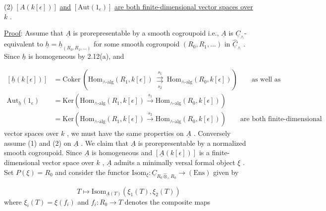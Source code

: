 (2)  $[A(k[\epsilon])]$  \underline{and}  $[\mathrm{Aut}(1_{\epsilon})]$  \underline{are both finite-dimensional vector spaces over}  $k$  .

\underline{Proof}:  Assume that  $\underline{A}$  is prorepresentable by a smooth cogroupoid i.e.,  $\underline{A}$  is  $\underline{C}_{\wedge}$-equivalent to  $\underline{h} = \underline{h}_{(R_{0},R_{1},\ldots)}$  for some smooth cogroupoid  $(R_{0},R_{1},\ldots)$  in  $\hat{\underline{C}}_{\wedge}$  . Since  $\underline{h}$  is homogeneous by 2.12(a), and

\begin{equation*}
\begin{aligned}
[\underline{h}(k[\epsilon])] &= \mathrm{Coker}\ (\mathrm{Hom}_{\wedge\text{-alg}}(R_{1},k[\epsilon]) \ \underset{s_{2}}{\overset{s_{1}}{\rightrightarrows}}\ \mathrm{Hom}_{\wedge\text{-alg}}(R_{0},k[\epsilon])) \qquad \text{as well as} \\[2ex]
\mathrm{Aut}_{\underline{h}}(1_{\epsilon}) &= \mathrm{Ker}(\mathrm{Hom}_{\wedge\text{-alg}}(R_{1},k[\epsilon]) \xrightarrow{\ s_{1}\ } \mathrm{Hom}_{\wedge\text{-alg}}(R_{0},k[\epsilon])) \\[2ex]
&= \mathrm{Ker}(\mathrm{Hom}_{\wedge\text{-alg}}(R_{1},k[\epsilon]) \xrightarrow{\ s_{2}\ } \mathrm{Hom}_{\wedge\text{-alg}}(R_{0},k[\epsilon])) \qquad \text{are both finite-dimensional}
\end{aligned}
\end{equation*}
vector spaces over  $k$  , we must have the same properties on  $\underline{A}$  . Conversely assume (1) and (2) on  $\underline{A}$  . We claim that  $\underline{A}$  is prorepresentable by a normalized smooth cogroupoid. Since  $\underline{A}$  is homogeneous and  $[\underline{A}(k[\epsilon])]$  is a finite-dimensional vector space over  $k$  ,  $\underline{A}$  admits a minimally versal formal object  $\xi$  . Set  $P(\xi) = R_{0}$  and consider the functor  $\mathrm{Isom}_{\xi} : \underline{C}_{R_{0} \hat{\otimes}_{\wedge} R_{0}} \to (\mathrm{Ens})$  given by

\begin{equation*}
T \longmapsto \mathrm{Isom}_{\underline{A}(T)}(\xi_{1}(T),\xi_{2}(T))
\end{equation*}
where  $\xi_{i}(T) = \xi(f_{i})$  and  $f_{i} : R_{0} \to T$  denotes the composite maps

